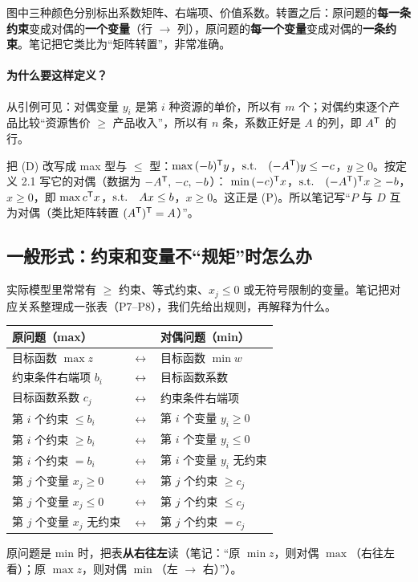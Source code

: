 图中三种颜色分别标出系数矩阵、右端项、价值系数。转置之后：原问题的\textbf{每一条约束}变成对偶的\textbf{一个变量}（行 $\to$ 列），原问题的\textbf{每一个变量}变成对偶的\textbf{一条约束}。笔记把它类比为“矩阵转置”，非常准确。

\paragraph{为什么要这样定义？}从引例可见：对偶变量 $y_i$ 是第 $i$ 种资源的单价，所以有 $m$ 个；对偶约束逐个产品比较“资源售价 $\ge$ 产品收入”，所以有 $n$ 条，系数正好是 $A$ 的列，即 $A^{\mathsf T}$ 的行。

\begin{proofbox}
把 (D) 改写成 max 型与 $\le$ 型：$\max\,(-b)^{\mathsf T} y$，$\text{s.t.}\quad (-A^{\mathsf T})y\le -c$，$y\ge0$。按定义 2.1 写它的对偶（数据为 $-A^{\mathsf T},\,-c,\,-b$）：
$\min\,(-c)^{\mathsf T} x$，$\text{s.t.}\quad (-A^{\mathsf T})^{\mathsf T} x\ge -b$，$x\ge0$，即 $\max c^{\mathsf T} x$，$\text{s.t.}\quad Ax\le b$，$x\ge0$。这正是 (P)。\quad 所以笔记写“$P$ 与 $D$ 互为对偶（类比矩阵转置 $(A^{\mathsf T})^{\mathsf T}=A$）”。
\end{proofbox}

\subsection{一般形式：约束和变量不“规矩”时怎么办}

实际模型里常常有 $\ge$ 约束、等式约束、$x_j\le0$ 或无符号限制的变量。笔记把对应关系整理成一张表（P7--P8），我们先给出规则，再解释为什么。

\begin{theorembox}
\begin{center}
\begin{tabular}{@{}l@{\qquad}c@{\qquad}l@{}}
\toprule
\textbf{原问题（max）} & & \textbf{对偶问题（min）}\\\midrule
目标函数 $\max z$ & $\longleftrightarrow$ & 目标函数 $\min w$\\
约束条件右端项 $b_i$ & $\longleftrightarrow$ & 目标函数系数\\
目标函数系数 $c_j$ & $\longleftrightarrow$ & 约束条件右端项\\\midrule
第 $i$ 个约束 $\le b_i$ & $\longleftrightarrow$ & 第 $i$ 个变量 $y_i\ge0$\\
第 $i$ 个约束 $\ge b_i$ & $\longleftrightarrow$ & 第 $i$ 个变量 $y_i\le0$\\
第 $i$ 个约束 $=b_i$ & $\longleftrightarrow$ & 第 $i$ 个变量 $y_i$ 无约束\\\midrule
第 $j$ 个变量 $x_j\ge0$ & $\longleftrightarrow$ & 第 $j$ 个约束 $\ge c_j$\\
第 $j$ 个变量 $x_j\le0$ & $\longleftrightarrow$ & 第 $j$ 个约束 $\le c_j$\\
第 $j$ 个变量 $x_j$ 无约束 & $\longleftrightarrow$ & 第 $j$ 个约束 $=c_j$\\\bottomrule
\end{tabular}
\end{center}
原问题是 min 时，把表\textbf{从右往左}读（笔记：“原 $\min z$，则对偶 $\max$（右往左看）；原 $\max z$，则对偶 $\min$（左 $\to$ 右）”）。
\end{theorembox}

